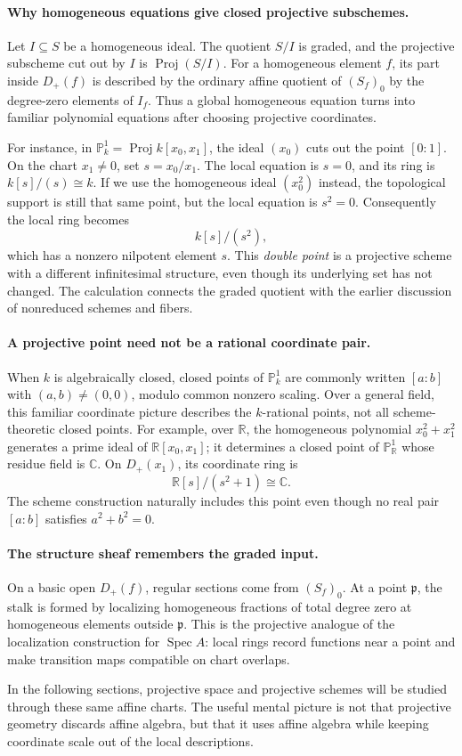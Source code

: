 \paragraph{Why homogeneous equations give closed projective subschemes.}
Let \(I\subseteq S\) be a homogeneous ideal. The quotient
\(S/I\) is graded, and the projective subscheme cut out by \(I\)
is \(\operatorname{Proj}(S/I)\). For a homogeneous element \(f\),
its part inside \(D_+(f)\) is described by the ordinary affine
quotient of \((S_f)_0\) by the degree-zero elements of \(I_f\).
Thus a global homogeneous equation turns into familiar polynomial
equations after choosing projective coordinates.

For instance, in \(\mathbb P^1_k=\operatorname{Proj}k[x_0,x_1]\),
the ideal \((x_0)\) cuts out the point \([0:1]\).
On the chart \(x_1\ne 0\), set \(s=x_0/x_1\). The local equation
is \(s=0\), and its ring is \(k[s]/(s)\cong k\).
If we use the homogeneous ideal \((x_0^2)\) instead, the topological
support is still that same point, but the local equation is
\(s^2=0\). Consequently the local ring becomes
\[
 k[s]/(s^2),
\]
which has a nonzero nilpotent element \(s\). This \emph{double point}
is a projective scheme with a different infinitesimal structure,
even though its underlying set has not changed. The calculation
connects the graded quotient with the earlier discussion of
nonreduced schemes and fibers.

\paragraph{A projective point need not be a rational coordinate pair.}
When \(k\) is algebraically closed, closed points of
\(\mathbb P^1_k\) are commonly written \([a:b]\) with
\((a,b)\ne(0,0)\), modulo common nonzero scaling. Over a general
field, this familiar coordinate picture describes the
\(k\)-rational points, not all scheme-theoretic closed points.
For example, over \(\mathbb R\), the homogeneous polynomial
\(x_0^2+x_1^2\) generates a prime ideal of
\(\mathbb R[x_0,x_1]\); it determines a closed point of
\(\mathbb P^1_{\mathbb R}\) whose residue field is \(\mathbb C\).
On \(D_+(x_1)\), its coordinate ring is
\[
 \mathbb R[s]/(s^2+1)\cong\mathbb C.
\]
The scheme construction naturally includes this point even though
no real pair \([a:b]\) satisfies \(a^2+b^2=0\).

\paragraph{The structure sheaf remembers the graded input.}
On a basic open \(D_+(f)\), regular sections come from
\((S_f)_0\). At a point \(\mathfrak p\), the stalk is formed by
localizing homogeneous fractions of total degree zero at homogeneous
elements outside \(\mathfrak p\). This is the projective analogue
of the localization construction for \(\operatorname{Spec}A\):
local rings record functions near a point and make transition maps
compatible on chart overlaps.

In the following sections, projective space and projective schemes
will be studied through these same affine charts. The useful mental
picture is not that projective geometry discards affine algebra,
but that it uses affine algebra while keeping coordinate scale out
of the local descriptions.

